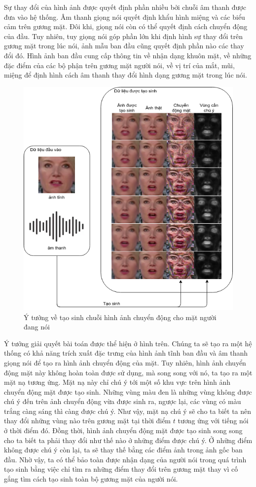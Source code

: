 Sự thay đổi của hình ảnh được quyết định phần nhiều bởi chuỗi âm thanh được đưa vào hệ thống. Âm thanh giọng nói quyết định khẩu hình miệng và các biểu cảm trên gương mặt. Đôi khi, giọng nói còn có thể quyết định cách chuyển động của đầu. Tuy nhiên, tuy giọng nói góp phần lớn khi định hình sự thay đổi trên gương mặt trong lúc nói, ảnh mẫu ban đầu cũng quyết định phần nào các thay đổi đó. Hình ảnh ban đầu cung cấp thông tin về nhận dạng khuôn mặt, về những đặc điểm của các bộ phận trên gương mặt người nói, về vị trí của mắt, mũi, miệng để định hình cách âm thanh thay đổi hình dạng gương mặt trong lúc nói.

\begin{figure}[H]
    \centering
    \includegraphics[width=12cm]{./content/materials/idea.png}
    \caption{Ý tưởng về tạo sinh chuỗi hình ảnh chuyển động cho mặt người đang nói}
\end{figure}

Ý tưởng giải quyết bài toán được thể hiện ở hình trên. Chúng ta sẽ tạo ra một hệ thống có khả năng trích xuất đặc trưng của hình ảnh tĩnh ban đầu và âm thanh giọng nói để tạo ra hình ảnh chuyển động của mặt. Tuy nhiên, hình ảnh chuyển động mặt này không hoàn toàn được sử dụng, mà song song với nó, ta tạo ra một mặt nạ tương ứng. Mặt nạ này chỉ chú ý tới một số khu vực trên hình ảnh chuyển động mặt được tạo sinh. Những vùng màu đen là những vùng không được chú ý đến trên ảnh chuyển động vừa được sinh ra, ngược lại, các vùng có màu trắng càng sáng thì càng được chú ý. Như vậy, mặt nạ chú ý sẽ cho ta biết ta nên thay đổi những vùng nào trên gương mặt tại thời điểm $t$ tương ứng với tiếng nói ở thời điểm đó. Đồng thời, hình ảnh chuyển động mặt được tạo sinh song song cho ta biết ta phải thay đổi như thế nào ở những điểm được chú ý. Ở những điểm không được chú ý còn lại, ta sẽ thay thế bằng các điểm ảnh trong ảnh gốc ban đầu. Nhờ vậy, ta có thể bảo toàn được nhận dạng của người nói trong quá trình tạo sinh bằng việc chỉ tìm ra những điểm thay đổi trên gương mặt thay vì cố gắng tìm cách tạo sinh toàn bộ gương mặt của người nói.

